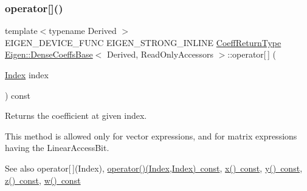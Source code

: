 \subsubsection{\texorpdfstring{operator[]()}{operator[]()}}
{\footnotesize\ttfamily template$<$typename Derived $>$ \\
E\+I\+G\+E\+N\+\_\+\+D\+E\+V\+I\+C\+E\+\_\+\+F\+U\+NC E\+I\+G\+E\+N\+\_\+\+S\+T\+R\+O\+N\+G\+\_\+\+I\+N\+L\+I\+NE \mbox{\hyperlink{struct_eigen_1_1internal_1_1true__type}{Coeff\+Return\+Type}} \mbox{\hyperlink{class_eigen_1_1_dense_coeffs_base}{Eigen\+::\+Dense\+Coeffs\+Base}}$<$ Derived, Read\+Only\+Accessors $>$\+::operator\mbox{[}$\,$\mbox{]} (\begin{DoxyParamCaption}\item[{\mbox{\hyperlink{struct_eigen_1_1_eigen_base_a554f30542cc2316add4b1ea0a492ff02}{Index}}}]{index }\end{DoxyParamCaption}) const\hspace{0.3cm}{\ttfamily [inline]}}

\begin{DoxyReturn}{Returns}
the coefficient at given index.
\end{DoxyReturn}
This method is allowed only for vector expressions, and for matrix expressions having the Linear\+Access\+Bit.

\begin{DoxySeeAlso}{See also}
operator\mbox{[}$\,$\mbox{]}(\+Index), \mbox{\hyperlink{class_eigen_1_1_dense_coeffs_base_3_01_derived_00_01_read_only_accessors_01_4_a29ac34389e098ec963ebb2ebd351335a}{operator()(\+Index,\+Index) const}}, \mbox{\hyperlink{class_eigen_1_1_dense_coeffs_base_3_01_derived_00_01_read_only_accessors_01_4_a36fb246141b6ea5ab5289d7eb6afdf6e}{x() const}}, \mbox{\hyperlink{class_eigen_1_1_dense_coeffs_base_3_01_derived_00_01_read_only_accessors_01_4_af2cb257225cf4348136a37fa9333ccda}{y() const}}, \mbox{\hyperlink{class_eigen_1_1_dense_coeffs_base_3_01_derived_00_01_read_only_accessors_01_4_a9040af2dcad8961168daafe09c1b1dc4}{z() const}}, \mbox{\hyperlink{class_eigen_1_1_dense_coeffs_base_3_01_derived_00_01_read_only_accessors_01_4_a422892fbb6b2eecce243776c3b8452ab}{w() const}} 
\end{DoxySeeAlso}
\mbox{\label{class_eigen_1_1_dense_coeffs_base_3_01_derived_00_01_read_only_accessors_01_4_a8141320ba8df384426c298b32b000d8e}} 
